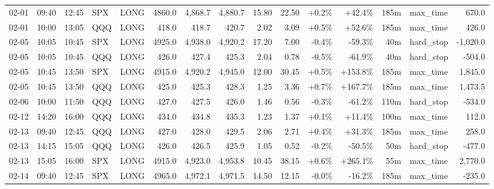 \documentclass[11pt,a4paper,twoside]{article}
\begin{document}
\begin{landscape}
\begin{center}
\begin{longtable}{>{\color{txtmain}}l l l l l r r r r r r r r >{\color{txtmain}}l r}
02-01 & 09:40 & 12:45 & SPX & LONG & 4860.0 & 4,868.7 & 4,880.7 & 15.80 & 22.50 & \textcolor{wingreen}{+0.2\%} & \textcolor{wingreen}{+42.4\%} & 185m & max\_time & \textcolor{wingreen}{670.0} \\
02-01 & 10:00 & 13:05 & QQQ & LONG & 418.0 & 418.7 & 420.7 & 2.02 & 3.09 & \textcolor{wingreen}{+0.5\%} & \textcolor{wingreen}{+52.6\%} & 185m & max\_time & \textcolor{wingreen}{426.0} \\
02-05 & 10:05 & 10:45 & SPX & LONG & 4925.0 & 4,938.0 & 4,920.2 & 17.20 & 7.00 & \textcolor{lossred}{-0.4\%} & \textcolor{lossred}{-59.3\%} & 40m & hard\_stop & \textcolor{lossred}{-1,020.0} \\
02-05 & 10:05 & 10:45 & QQQ & LONG & 426.0 & 427.4 & 425.3 & 2.04 & 0.78 & \textcolor{lossred}{-0.5\%} & \textcolor{lossred}{-61.9\%} & 40m & hard\_stop & \textcolor{lossred}{-504.0} \\
02-05 & 10:45 & 13:50 & SPX & LONG & 4915.0 & 4,920.2 & 4,945.0 & 12.00 & 30.45 & \textcolor{wingreen}{+0.5\%} & \textcolor{wingreen}{+153.8\%} & 185m & max\_time & \textcolor{wingreen}{1,845.0} \\
02-05 & 10:45 & 13:50 & QQQ & LONG & 425.0 & 425.3 & 428.3 & 1.25 & 3.36 & \textcolor{wingreen}{+0.7\%} & \textcolor{wingreen}{+167.7\%} & 185m & max\_time & \textcolor{wingreen}{1,473.5} \\
02-06 & 10:00 & 11:50 & QQQ & LONG & 427.0 & 427.5 & 426.0 & 1.46 & 0.56 & \textcolor{lossred}{-0.3\%} & \textcolor{lossred}{-61.2\%} & 110m & hard\_stop & \textcolor{lossred}{-534.0} \\
02-12 & 14:20 & 16:00 & QQQ & LONG & 434.0 & 434.8 & 435.3 & 1.23 & 1.37 & \textcolor{wingreen}{+0.1\%} & \textcolor{wingreen}{+11.4\%} & 100m & max\_time & \textcolor{wingreen}{112.0} \\
02-13 & 09:40 & 12:45 & QQQ & LONG & 427.0 & 428.0 & 429.5 & 2.06 & 2.71 & \textcolor{wingreen}{+0.4\%} & \textcolor{wingreen}{+31.3\%} & 185m & max\_time & \textcolor{wingreen}{258.0} \\
02-13 & 14:15 & 15:05 & QQQ & LONG & 426.0 & 426.5 & 425.9 & 1.05 & 0.52 & \textcolor{lossred}{-0.2\%} & \textcolor{lossred}{-50.5\%} & 50m & hard\_stop & \textcolor{lossred}{-477.0} \\
02-13 & 15:05 & 16:00 & SPX & LONG & 4915.0 & 4,923.0 & 4,953.8 & 10.45 & 38.15 & \textcolor{wingreen}{+0.6\%} & \textcolor{wingreen}{+265.1\%} & 55m & max\_time & \textcolor{wingreen}{2,770.0} \\
02-14 & 09:40 & 12:45 & SPX & LONG & 4965.0 & 4,972.1 & 4,971.5 & 14.50 & 12.15 & \textcolor{lossred}{-0.0\%} & \textcolor{lossred}{-16.2\%} & 185m & max\_time & \textcolor{lossred}{-235.0} \\

\end{longtable}
\end{center}
\end{landscape}
\end{document}

